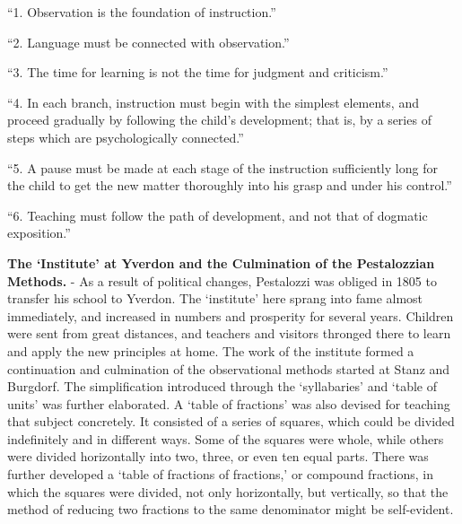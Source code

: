 \documentclass[]{book}
\begin{document}
``1. Observation is the foundation of instruction.''

``2. Language must be connected with observation.''

``3. The time for learning is not the time for judgment and criticism.''

``4. In each branch, instruction must begin with the simplest elements, and proceed gradually by following the child's development; that is, by a series of steps which are psychologically connected.''

``5. A pause must be made at each stage of the instruction sufficiently long for the child to get the new matter thoroughly into his grasp and under his control.''

``6. Teaching must follow the path of development, and not that of dogmatic exposition.''

\textbf{The `Institute' at Yverdon and the Culmination of the Pestalozzian Methods.} - As a result of political changes, Pestalozzi was obliged in 1805 to transfer his school to Yverdon. The `institute' here sprang into fame almost immediately, and increased in numbers and prosperity for several years. Children were sent from great distances, and teachers and visitors thronged there to learn and apply the new principles at home. The work of the institute formed a continuation and culmination of the observational methods started at Stanz and Burgdorf. The simplification introduced through the `syllabaries' and `table of units' was further elaborated. A `table of fractions' was also devised for teaching that subject concretely. It consisted of a series of squares, which could be divided indefinitely and in different ways. Some of the squares were whole, while others were divided horizontally into two, three, or even ten equal parts. There was further developed a `table of fractions of fractions,' or compound fractions, in which the squares were divided, not only horizontally, but vertically, so that the method of reducing two fractions to the same denominator might be self-evident.
\end{document}
